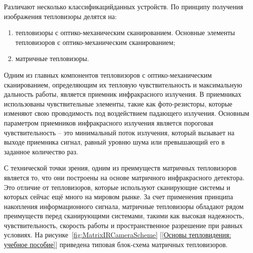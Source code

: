 \documentclass[14pt, a4paper]{extreport}
\begin{document}
	Различают несколько классификацийданных устройств. По принципу получения изображения тепловизоры делятся на:
	\begin{enumerate}[label={\arabic*)}]
		\item тепловизоры с оптико-механическим сканированием. Основные элементы тепловизоров с оптико-механическим сканированием;
		\item матричные тепловизоры.
	\end{enumerate}	
	
	Одним из главных компонентов тепловизоров с оптико-механическим сканированием, определяющим их тепловую чувствительность и максимальную дальность работы, является приемник инфракрасного излучения. В приемниках использованы чувствительные элементы, такие как фото-резисторы, которые изменяют свою проводимость под воздействием падающего излучения. Основным параметром приемников инфракрасного излучения является пороговая чувствительность -- это минимальный поток излучения, который вызывает на выходе приемника сигнал, равный уровню шума или превышающий его в заданное количество раз.
	
	С технической точки зрения, одним из преимуществ матричных тепловизоров является то, что они построены на основе матричного инфракрасного детектора. Это отличие от тепловизоров, которые используют сканирующие системы и которых сейчас ещё много на мировом рынке. За счет применения принципа накопления информационного сигнала, матричные тепловизоры обладают рядом преимуществ перед сканирующими системами, такими как высокая надежность, чувствительность, скорость работы и пространственное разрешение при равных условиях. На рисунке~\ref{fig:MatrixIRCameraScheme} [\ref{Основы тепловидения: учебное пособие}] приведена типовая блок-схема матричных тепловизоров.
	
\end{document}
